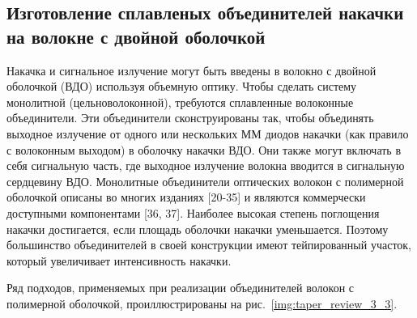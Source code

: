  \subsection{Изготовление сплавленых объединителей накачки на волокне с двойной оболочкой}

Накачка и сигнальное излучение могут быть введены в волокно с двойной оболочкой (ВДО) используя объемную оптику. Чтобы сделать систему монолитной (цельноволоконной), требуются сплавленные волоконные объединители. Эти объединители сконструированы так, чтобы объединять выходное излучение от одного или нескольких ММ диодов накачки (как правило с волоконным выходом) в оболочку накачки ВДО. Они также могут включать в себя сигнальную часть, где выходное излучение волокна вводится в сигнальную сердцевину ВДО. Монолитные объединители оптических волокон с полимерной оболочкой описаны во многих изданиях [20-35] и являются коммерчески доступными компонентами [36, 37]. Наиболее высокая степень поглощения накачки достигается, если площадь оболочки накачки уменьшается. Поэтому большинство объединителей в своей конструкции имеют тейпированный участок, который увеличивает интенсивность накачки.

Ряд подходов, применяемых при реализации объединителей волокон с полимерной оболочкой, проиллюстрированы на рис.~\ref{img:taper_review_3_3}.

